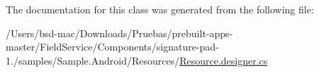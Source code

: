 The documentation for this class was generated from the following file\+:\begin{DoxyCompactItemize}
\item 
/\+Users/bsd-\/mac/\+Downloads/\+Pruebas/prebuilt-\/apps-\/master/\+Field\+Service/\+Components/signature-\/pad-\/1./samples/\+Sample.\+Android/\+Resources/\hyperlink{_components_2signature-pad-1_82_2samples_2_sample_8_android_2_resources_2_resource_8designer_8cs}{Resource.\+designer.\+cs}\end{DoxyCompactItemize}
